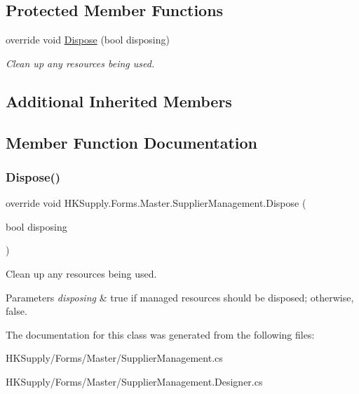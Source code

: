 \subsection*{Protected Member Functions}
\begin{DoxyCompactItemize}
\item 
override void \mbox{\hyperlink{class_h_k_supply_1_1_forms_1_1_master_1_1_supplier_management_a0f812e9b8d22eda4e3ad8e6a9ad6c553}{Dispose}} (bool disposing)
\begin{DoxyCompactList}\small\item\em Clean up any resources being used. \end{DoxyCompactList}\end{DoxyCompactItemize}
\subsection*{Additional Inherited Members}


\subsection{Member Function Documentation}
\mbox{\label{class_h_k_supply_1_1_forms_1_1_master_1_1_supplier_management_a0f812e9b8d22eda4e3ad8e6a9ad6c553}} 
\subsubsection{\texorpdfstring{Dispose()}{Dispose()}}
{\footnotesize\ttfamily override void H\+K\+Supply.\+Forms.\+Master.\+Supplier\+Management.\+Dispose (\begin{DoxyParamCaption}\item[{bool}]{disposing }\end{DoxyParamCaption})\hspace{0.3cm}{\ttfamily [protected]}}



Clean up any resources being used. 


\begin{DoxyParams}{Parameters}
{\em disposing} & true if managed resources should be disposed; otherwise, false.\\
\hline
\end{DoxyParams}


The documentation for this class was generated from the following files\+:\begin{DoxyCompactItemize}
\item 
H\+K\+Supply/\+Forms/\+Master/Supplier\+Management.\+cs\item 
H\+K\+Supply/\+Forms/\+Master/Supplier\+Management.\+Designer.\+cs\end{DoxyCompactItemize}

